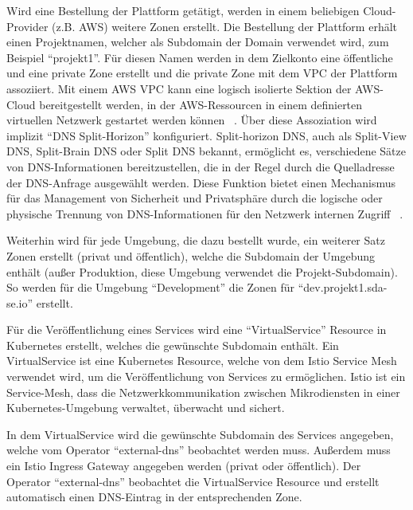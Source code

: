 Wird eine Bestellung der Plattform getätigt, werden in einem beliebigen Cloud-Provider (z.B. AWS) weitere Zonen erstellt.
Die Bestellung der Plattform erhält einen Projektnamen, welcher als Subdomain der Domain verwendet wird, zum Beispiel \enquote{projekt1}.
Für diesen Namen werden in dem Zielkonto eine öffentliche und eine private Zone erstellt und die private Zone mit dem \ac{VPC} der Plattform assoziiert.
Mit einem AWS VPC kann eine logisch isolierte Sektion der AWS-Cloud bereitgestellt werden, in der AWS-Ressourcen in einem definierten virtuellen Netzwerk gestartet werden können ~\cite[p.~12]{mathew2014overview}.
Über diese Assoziation wird implizit \enquote{DNS Split-Horizon} konfiguriert.
Split-horizon DNS, auch als Split-View DNS, Split-Brain DNS oder Split DNS bekannt, ermöglicht es, verschiedene Sätze von DNS-Informationen bereitzustellen, die
in der Regel durch die Quelladresse der DNS-Anfrage ausgewählt werden.
Diese Funktion bietet einen Mechanismus für das Management von Sicherheit und Privatsphäre durch die logische oder
physische Trennung von DNS-Informationen für den Netzwerk internen Zugriff ~\cite{wikipedia:split-horizon}.
\medskip

Weiterhin wird für jede Umgebung, die dazu bestellt wurde, ein weiterer Satz Zonen erstellt (privat und öffentlich), welche die Subdomain der Umgebung enthält (außer Produktion, diese Umgebung verwendet die Projekt-Subdomain).
So werden für die Umgebung \enquote{Development} die Zonen für \enquote{dev.projekt1.sda-se.io} erstellt.
\medskip

Für die Veröffentlichung eines Services wird eine \enquote{VirtualService} Resource in Kubernetes erstellt, welches die gewünschte Subdomain enthält.
Ein VirtualService ist eine Kubernetes Resource, welche von dem Istio Service Mesh verwendet wird, um die Veröffentlichung von Services zu ermöglichen.
Istio ist ein Service-Mesh, dass die Netzwerkkommunikation zwischen Mikrodiensten in einer Kubernetes-Umgebung verwaltet, überwacht und sichert.
\medskip

In dem VirtualService wird die gewünschte Subdomain des Services angegeben, welche vom Operator \enquote{external-dns} beobachtet werden muss.
Außerdem muss ein Istio Ingress Gateway angegeben werden (privat oder öffentlich).
Der Operator \enquote{external-dns} beobachtet die VirtualService Resource und erstellt automatisch einen DNS-Eintrag in der entsprechenden Zone.
\medskip


